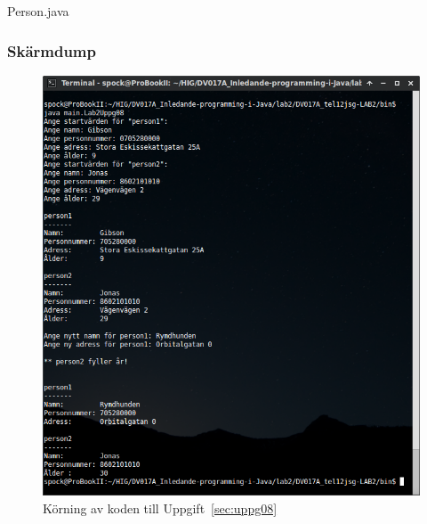 \caption{Person.java}
\label{src:Person}


\subsubsection{Skärmdump}
\begin{figure}[htbp]
    \centering
        \includegraphics[width=\linewidth]{img/08.png}
    \caption{Körning av koden till Uppgift~\ref{sec:uppg08}}
    \label{fig:uppg08-screenshot}
\end{figure}

